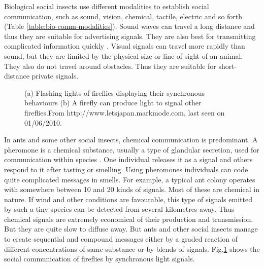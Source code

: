 Biological social insects use different modalities to establish social communication, such as sound, vision, chemical, tactile,  electric and so forth (Table \ref{table:bio-comm-modalities}).  Sound waves can travel a long distance and thus they are suitable for advertising signals. They are also best for transmitting complicated information quickly \cite{Slater1986}. Visual signals can travel more rapidly than sound, but they are limited by the physical size or line of sight of an animal. They also do not travel around obstacles. Thus they are suitable for short-distance private signals.

\begin{figure}[htp]
\centering
{} 
\hspace{0.25cm}
\caption{(a) Flashing lights of fireflies displaying their synchronous behaviours (b) A firefly can produce light to signal other fireflies.\protect\newline From http://www.letsjapan.markmode.com, last seen on 01/06/2010.}
\label{fig:fireflies}
\end{figure}
%
In ants and some other social insects, chemical communication is predominant.  A pheromone is a chemical substance, usually a type of glandular secretion, used for communication within species \cite{Holldobler1990}. One individual releases it as a signal and others respond to it after tasting or smelling. Using pheromones individuals can code quite complicated messages in smells. For example, a typical ant colony operates with somewhere between 10 and 20 kinds of signals. Most of these are chemical in nature. If wind and other conditions are favourable,  this type of signals emitted by such a tiny species can be detected from several kilometres away. Thus chemical signals are extremely economical of their production and transmission. But they are quite slow to diffuse away. But ants and other social insects manage to create sequential and compound messages either by a graded reaction of different concentrations of same substance or by blends of signals. Fig.\ref{fig:fireflies} shows the social communication of fireflies by  synchronous light signals.

